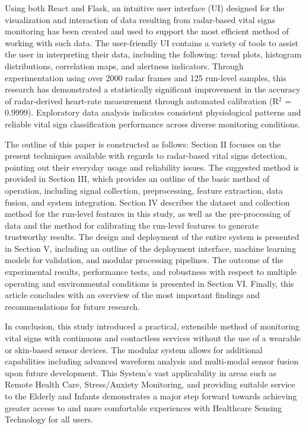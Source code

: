 \documentclass[conference]{IEEEtran}
\begin{document}
Using both React and Flask, an intuitive user interface (UI) designed for the visualization and interaction of data resulting from radar-based vital signs monitoring has been created and used to support the most efficient method of working with such data. The user-friendly UI contains a variety of tools to assist the user in interpreting their data, including the following: trend plots, histogram distributions, correlation maps, and alertness indicators. Through experimentation using over 2000 radar frames and 125 run-level samples, this research has demonstrated a statistically significant improvement in the accuracy of radar-derived heart-rate measurement through automated calibration (R$^2$ = 0.9999). Exploratory data analysis indicates consistent physiological patterns and reliable vital sign classification performance across diverse monitoring conditions.

The outline of this paper is constructed as follows: Section II focuses on the present techniques available with regards to radar-based vital signs detection, pointing out their everyday usage and reliability issues. The suggested method is provided in Section III, which provides an outline of the basic method of operation, including signal collection, preprocessing, feature extraction, data fusion, and system integration. Section IV describes the dataset and collection method for the run-level features in this study, as well as the pre-processing of data and the method for calibrating the run-level features to generate trustworthy results. The design and deployment of the entire system is presented in Section V, including an outline of the deployment interface, machine learning models for validation, and modular processing pipelines. The outcome of the experimental results, performance tests, and robustness with respect to multiple operating and environmental conditions is presented in Section VI. Finally, this article concludes with an overview of the most important findings and recommendations for future research.

In conclusion, this study introduced a practical, extensible method of monitoring vital signs with continuous and contactless services without the use of a wearable or skin-based sensor devices. The modular system allows for additional capabilities including advanced waveform analysis and multi-modal sensor fusion upon future development. This System's vast applicability in areas such as Remote Health Care, Stress/Anxiety Monitoring, and providing suitable service to the Elderly and Infants demonstrates a major step forward towards achieving greater access to and more comfortable experiences with Healthcare Sensing Technology for all users.
\end{document}
